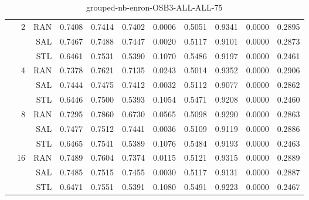 \begin{center}
\begin{table}[htbp]
\begin{center}
\begin{tabular}{ | r | r | r | r | r | r | r | r | r | r | r |}
 & \multirow{3}{*}{2} & RAN & 0.7408 & 0.7414 & 0.7402 & 0.0006 & 0.5051 & 0.9341 & 0.0000 & 0.2895\\ \cline{3-11}
 &   & SAL & 0.7467 & 0.7488 & 0.7447 & 0.0020 & 0.5117 & 0.9101 & 0.0000 & 0.2873\\ \cline{3-11}
 &   & STL & 0.6461 & 0.7531 & 0.5390 & 0.1070 & 0.5486 & 0.9197 & 0.0000 & 0.2461\\ \cline{2-11}
 & \multirow{3}{*}{4} & RAN & 0.7378 & 0.7621 & 0.7135 & 0.0243 & 0.5014 & 0.9352 & 0.0000 & 0.2906\\ \cline{3-11}
 &   & SAL & 0.7444 & 0.7475 & 0.7412 & 0.0032 & 0.5112 & 0.9077 & 0.0000 & 0.2862\\ \cline{3-11}
 &   & STL & 0.6446 & 0.7500 & 0.5393 & 0.1054 & 0.5471 & 0.9208 & 0.0000 & 0.2460\\ \cline{2-11}
 & \multirow{3}{*}{8} & RAN & 0.7295 & 0.7860 & 0.6730 & 0.0565 & 0.5098 & 0.9290 & 0.0000 & 0.2863\\ \cline{3-11}
 &   & SAL & 0.7477 & 0.7512 & 0.7441 & 0.0036 & 0.5109 & 0.9119 & 0.0000 & 0.2886\\ \cline{3-11}
 &   & STL & 0.6465 & 0.7541 & 0.5389 & 0.1076 & 0.5484 & 0.9193 & 0.0000 & 0.2463\\ \cline{2-11}
 & \multirow{3}{*}{16} & RAN & 0.7489 & 0.7604 & 0.7374 & 0.0115 & 0.5121 & 0.9315 & 0.0000 & 0.2889\\ \cline{3-11}
 &   & SAL & 0.7485 & 0.7515 & 0.7455 & 0.0030 & 0.5117 & 0.9131 & 0.0000 & 0.2887\\ \cline{3-11}
 &   & STL & 0.6471 & 0.7551 & 0.5391 & 0.1080 & 0.5491 & 0.9223 & 0.0000 & 0.2467\\ \cline{2-11}
\hline
\end{tabular}
\caption{grouped-nb-enron-OSB3-ALL-ALL-75}
\end{center}
 \end{table}
\end{center}

